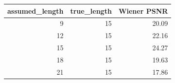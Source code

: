 \begin{tabular}{rrr}
\toprule
assumed_length & true_length & Wiener PSNR \\
\midrule
9 & 15 & 20.09 \\
12 & 15 & 22.16 \\
15 & 15 & 24.27 \\
18 & 15 & 19.63 \\
21 & 15 & 17.86 \\
\bottomrule
\end{tabular}
